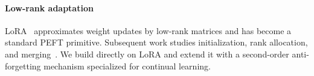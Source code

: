 \paragraph{Low-rank adaptation}
LoRA~\cite{hu2022lora} approximates weight updates by low-rank matrices and has become a
standard PEFT primitive. Subsequent work studies initialization, rank allocation, and
merging~\cite{luo2025eratdlora,li2026adapterx}. We build directly on LoRA and extend it
with a second-order anti-forgetting mechanism specialized for continual learning.



